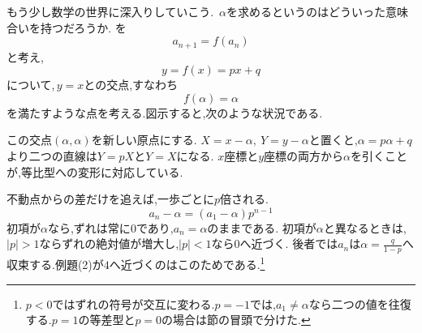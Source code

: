 \label{解釈：不動点と差分}
  もう少し数学の世界に深入りしていこう.
  \,$\alpha$を求めるというのはどういった意味合いを持つだろうか.
  を
  \[
    a_{n+1}=f(a_n)
  \]
  と考え,
  \[
    y=f(x)=px+q
  \]
  について,\,$y=x$との交点,すなわち
  \[
    f(\alpha)=\alpha
  \]
  を満たすような点を考える.図示すると,次のような状況である.

  \begin{center}
  \end{center}

  この交点$(\alpha,\alpha)$を新しい原点にする.
  $X=x-\alpha,\ Y=y-\alpha$と置くと,$\alpha=p\alpha+q$より二つの直線は$Y=pX$と$Y=X$になる.
  $x$座標と$y$座標の両方から$\alpha$を引くことが,等比型への変形に対応している.

  不動点からの差だけを追えば,一歩ごとに$p$倍される.
  \[
    a_n-\alpha=(a_1-\alpha)p^{n-1}
  \]
  初項が$\alpha$なら,ずれは常に$0$であり,$a_n=\alpha$のままである.
  初項が$\alpha$と異なるときは,$|p|>1$ならずれの絶対値が増大し,$|p|<1$なら$0$へ近づく.
  後者では$a_n$は$\alpha=\frac{q}{1-p}$へ収束する.例題(2)が$4$へ近づくのはこのためである.\footnote{$p<0$ではずれの符号が交互に変わる.$p=-1$では,$a_1\ne\alpha$なら二つの値を往復する.$p=1$の等差型と$p=0$の場合は節の冒頭で分けた.}

